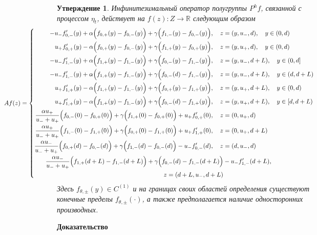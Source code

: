 \documentclass[12pt,a4paper]{article}
\newtheorem{utv}{Утверждение}
\begin{document}
\begin{utv}\label{utv_2}
Инфинитезимальный оператор полугруппы $P^h f$, связанной с процессом $\eta_t$, действует на $f(z): Z \to \mathbb{R}$ следующим образом
\begin{equation*}
\null \hspace*{-3cm} A f(z) =
\left\{ \begin{aligned} 
   -u_- f_{0,-}' (y) + \alpha \Bigl(f_{0,+}(y) - f_{0,-}(y) \Bigr) + \gamma \Bigl(f_{1,-} (y) - f_{0,-} (y) \Bigr) , \quad z &= (y, u_-, d),  \quad  y \in (0, d)\\
   u_+ f_{0,+}' (y) - \alpha \Bigl(f_{0,+}(y) - f_{0,-}(y) \Bigr) + \gamma \Bigl(f_{1,+} (y) - f_{0,+} (y) \Bigr), \quad  z &= (y, u_+, d),  \quad  y \in (0, d)\\
   -u_- f_{1,-}' (y) + \alpha \Bigl(f_{1,+}(y) - f_{1,-}(y) \Bigr) + \gamma \Bigl(f_{0,-} (y) - f_{1,-} (y) \Bigr), \quad  z &= (y, u_-, d + L), \quad y \in (0, d]\\
   -u_- f_{1,-}' (y) + \alpha \Bigl(f_{1,+}(y) - f_{1,-}(y) \Bigr) + \gamma \Bigl(f_{0,-} (d) - f_{1,-} (y) \Bigr), \quad  z &= (y, u_-, d + L), \quad y \in (d, d + L)\\
   u_+ f_{1,+}' (y) - \alpha \Bigl(f_{1,+}(y) - f_{1,-}(y) \Bigr) + \gamma \Bigl(f_{0,+} (y) - f_{1,+} (y) \Bigr), \quad  z &= (y, u_+, d + L), \quad y \in (0, d)\\
   u_+ f_{1,+}' (y) - \alpha \Bigl(f_{1,+}(y) - f_{1,-}(y) \Bigr) + \gamma \Bigl(f_{0,-} (d) - f_{1,+} (y) \Bigr), \quad  z &= (y, u_+, d + L), \quad y \in [d, d + L)\\
   \frac{\alpha u_+}{u_- + u_+} \Bigl(f_{0,-} (0) - f_{0,+} (0)\Bigr) + \gamma \Bigl( f_{1,+} (0) - f_{0,+} (0) \Bigr) + u_+ f_{0,+}' (0), \quad z &= (0, u_+, d)\\
    \frac{\alpha u_+}{u_- + u_+} \Bigl(f_{1,-} (0) - f_{1,+} (0)\Bigr) + \gamma \Bigl( f_{0,+} (0) - f_{1,+} (0) \Bigr) + u_+ f_{1,+}' (0), \quad  z &= (0, u_+, d + L)\\
   \frac{\alpha u_-}{u_- + u_+} \Bigl(f_{0,+} (d) - f_{0,-} (d)\Bigr) + \gamma \Bigl( f_{1,-} (d) - f_{0,-} (d) \Bigr) - u_- f_{0,-}' (d), \quad  z &= (d, u_-, d)\\
   \frac{\alpha u_-}{u_- + u_+} \Bigl(f_{1,+} (d + L) - f_{1,-} (d + L)\Bigr) + \gamma \Bigl( f_{0,-} (d) - f_{1,-} (d + L) \Bigr) &- u_- f_{1,-}' (d + L), \\  z = (d + L, u_-, d + L)
\end{aligned} \right.
\end{equation*}
Здесь $f_{\theta, \pm} (y) \in C^{(1)}$ и на границах своих областей определения существуют конечные пределы $f_{\theta, \pm} ( \cdot )$, а также предполагается наличие односторонних производных.
\end{utv}
\textbf{Доказательство}
\end{document}
